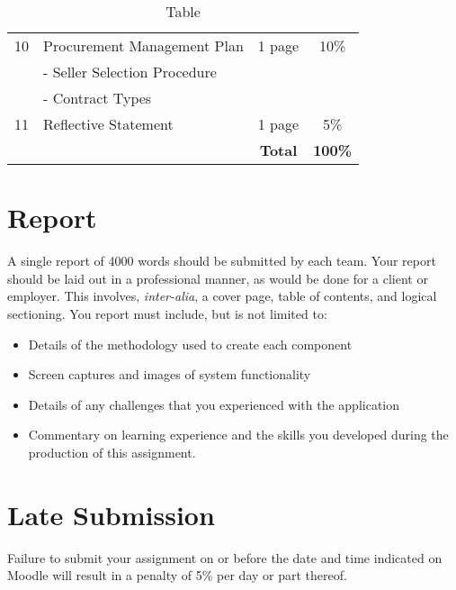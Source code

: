 \begin{table}[ht]
\begin{tabular}{|c|l|c|c|}
		10  & Procurement Management Plan &  1 page  & 10\% \\
   			&	- Seller Selection Procedure  & & \\
   			&	- Contract Types  & & \\
		\hline

		11  & Reflective Statement &  1 page  & 5\% \\
		\hline
		\hline
        & & \textbf{Total} & \textbf{100\%} \\
		\hline
	
	\end{tabular}
	\caption{Table }
	\label{tab:AM}
\end{table}


\newpage
\section*{Report}
A single report of 4000 words should be submitted by each team.  Your report should be laid out in a professional manner, as would be done for a client or employer.  This involves, \emph{inter-alia}, a cover page, table of contents, and logical sectioning.  You report must include, but is not limited to:
\begin{itemize}
	\item Details of the methodology used to create each component
	\item Screen captures and images of system functionality
	\item Details of any challenges that you experienced with the application
	\item Commentary on learning experience and the skills you developed during the production of this assignment.
\end{itemize}
  


\section*{Late Submission}
Failure to submit your assignment on or before the date and time indicated on Moodle will result in a penalty of 5\% per day or part thereof.


